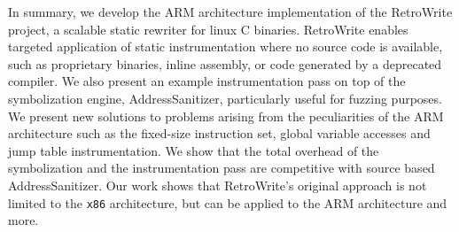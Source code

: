 \documentclass[a4paper,11pt,oneside]{report}
\newcommand{\sysname}{RetroWrite\xspace}
\begin{document}
In summary, we develop the ARM architecture implementation of the \sysname 
project, a scalable static rewriter for linux C binaries.  \sysname enables 
targeted application of static instrumentation where no source code is 
available, such as proprietary binaries, inline assembly, or code generated by 
a deprecated compiler.  We also present an example instrumentation pass on top 
of the symbolization engine, AddressSanitizer, particularly useful for fuzzing 
purposes. We present new solutions to problems arising from the peculiarities 
of the ARM architecture such as the fixed-size instruction set, global variable 
accesses and jump table instrumentation. We show that the total overhead of the 
symbolization and the instrumentation pass are competitive with source based 
AddressSanitizer.  Our work shows that \sysname's original approach is not 
limited to the \texttt{x86} architecture, but can be applied to the ARM 
architecture and more.



\cleardoublepage
{}

\printbibliography

%
%
\end{document}
